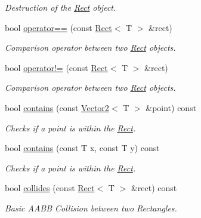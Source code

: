 \begin{DoxyCompactItemize}
\begin{DoxyCompactList}\small\item\em Destruction of the \hyperlink{classsparky_1_1_rect}{Rect} object. \end{DoxyCompactList}\item 
bool \hyperlink{classsparky_1_1_rect_a52dc153037e34347bd84af37120fb0bd}{operator==} (const \hyperlink{classsparky_1_1_rect}{Rect}$<$ T $>$ \&rect)
\begin{DoxyCompactList}\small\item\em Comparison operator between two \hyperlink{classsparky_1_1_rect}{Rect} objects. \end{DoxyCompactList}\item 
bool \hyperlink{classsparky_1_1_rect_a9fa27247c974c34a16ca17e1f8c45ad3}{operator!=} (const \hyperlink{classsparky_1_1_rect}{Rect}$<$ T $>$ \&rect)
\begin{DoxyCompactList}\small\item\em Comparison operator between two \hyperlink{classsparky_1_1_rect}{Rect} objects. \end{DoxyCompactList}\item 
bool \hyperlink{classsparky_1_1_rect_a12aeecda22999bd23c0bc6de948ff3ea}{contains} (const \hyperlink{classsparky_1_1_vector2}{Vector2}$<$ T $>$ \&point) const 
\begin{DoxyCompactList}\small\item\em Checks if a point is within the \hyperlink{classsparky_1_1_rect}{Rect}. \end{DoxyCompactList}\item 
bool \hyperlink{classsparky_1_1_rect_a98c5ef1b53c2b82c4d58fb558b3a030e}{contains} (const T x, const T y) const 
\begin{DoxyCompactList}\small\item\em Checks if a point is within the \hyperlink{classsparky_1_1_rect}{Rect}. \end{DoxyCompactList}\item 
bool \hyperlink{classsparky_1_1_rect_a7aa5dc601ebf9f612e36d70af90adda2}{collides} (const \hyperlink{classsparky_1_1_rect}{Rect}$<$ T $>$ \&rect) const 
\begin{DoxyCompactList}\small\item\em Basic A\+A\+BB Collision between two Rectangles. \end{DoxyCompactList}\end{DoxyCompactItemize}
